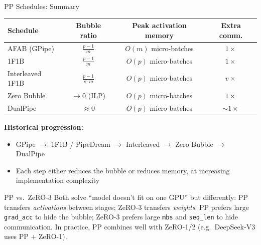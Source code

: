 \begin{frame}{PP Schedules: Summary}

  \begin{center}
  \renewcommand{\arraystretch}{1.2}
  \begin{tabular}{l c c c}
    \toprule
    \textbf{Schedule} & \textbf{Bubble ratio} & \textbf{Peak activation memory} & \textbf{Extra comm.} \\
    \midrule
    AFAB (GPipe) & $\frac{p-1}{m}$ & $O(m)$ micro-batches & $1\times$ \\[0.3em]
    1F1B         & $\frac{p-1}{m}$ & $O(p)$ micro-batches & $1\times$ \\[0.3em]
    Interleaved 1F1B & $\frac{p-1}{v \cdot m}$ & $O(p)$ micro-batches & $v\times$ \\[0.3em]
    Zero Bubble  & $\to 0$ (ILP) & $O(p)$ micro-batches & $1\times$ \\[0.3em]
    DualPipe     & $\approx 0$ & $O(p)$ micro-batches & ${\sim}1\times$ \\
    \bottomrule
  \end{tabular}
  \end{center}

  \vspace{0.3em}
  \textbf{Historical progression:}
  \begin{itemize}
    \item GPipe $\to$ 1F1B / PipeDream $\to$ Interleaved $\to$ Zero Bubble $\to$ DualPipe
    \item Each step either reduces the bubble or reduces memory, at increasing implementation complexity
  \end{itemize}

  \vspace{0.3em}
  \begin{alertblock}{PP vs.\ ZeRO-3}
    Both solve ``model doesn't fit on one GPU'' but differently: PP transfers \emph{activations} between stages; ZeRO-3 transfers \emph{weights}. PP prefers large \texttt{grad\_acc} to hide the bubble; ZeRO-3 prefers large \texttt{mbs} and \texttt{seq\_len} to hide communication.
    In practice, PP combines well with ZeRO-1/2 (e.g.\ DeepSeek-V3 uses PP + ZeRO-1).
  \end{alertblock}
\end{frame}
